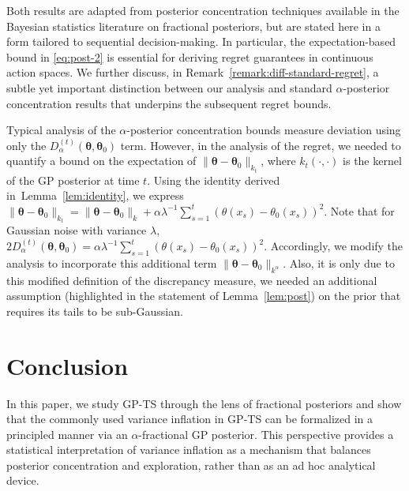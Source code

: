 \documentclass[final,12pt]{colt2026} %
\begin{document}
Both results are adapted from posterior concentration techniques available in the Bayesian statistics literature on fractional posteriors, but are stated here in a form tailored to sequential decision-making. In particular, the expectation-based bound in \eqref{eq:post-2} is essential for deriving regret guarantees in continuous action spaces. We further discuss, in Remark~\ref{remark:diff-standard-regret}, a subtle yet important distinction between our analysis and standard $\alpha$-posterior concentration results that underpins the subsequent regret bounds.


\begin{remark}
\label{remark:diff-standard-regret}
Typical analysis of the $\alpha$-posterior concentration bounds measure deviation using only the $D_{\alpha}^{(t)}(\pmb \theta,\pmb \theta_0)$ term. However, in the analysis of the regret, we needed to quantify a bound on the expectation of $\|\pmb \theta-\pmb \theta_0\|_{k_{t}}$, where $k_{t}(\cdot, \cdot)$ is the kernel of the GP posterior at time $t$. Using the identity derived in~Lemma~\ref{lem:identity}, we express $\|\pmb \theta-\pmb \theta_0\|_{k_{t}}=\|\pmb \theta-\pmb \theta_0\|_{k} + \alpha \lambda^{-1}\sum_{s=1}^{t} (\theta(x_s)-\theta_0(x_s))^2$. Note that for Gaussian noise with variance $\lambda$,  $2 D_{\alpha}^{(t)}(\pmb \theta,\pmb \theta_0)= \alpha \lambda^{-1}\sum_{s=1}^{t} (\theta(x_s)-\theta_0(x_s))^2$. Accordingly, we modify the analysis to incorporate this additional term $\|\pmb \theta-\pmb \theta_0\|_{k^\alpha}$. Also, it is only due to this modified definition of the discrepancy measure, we needed an additional assumption (highlighted in the statement of Lemma~\ref{lem:post}) on the prior that requires its tails to be sub-Gaussian. %
\end{remark}

\section{Conclusion}\label{sec:conclusion}
In this paper, we study GP-TS through the lens of fractional posteriors and show that the commonly used variance inflation in GP-TS can be formalized in a principled manner via an $\alpha$-fractional GP posterior. This perspective provides a statistical interpretation of variance inflation as a mechanism that balances posterior concentration and exploration, rather than as an ad hoc analytical device.
\end{document}
